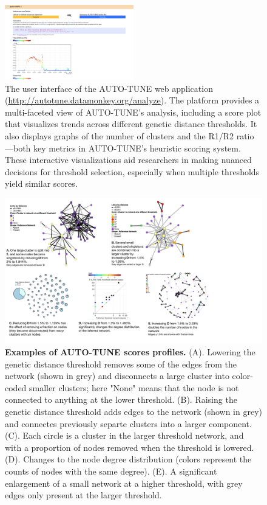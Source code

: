 \documentclass[utf8]{FrontiersinHarvard} %
\begin{document}
\begin{figure}[h!]
  \centering
  \includegraphics[width=0.5\textwidth]{./figures/webapp.png}
	\caption{ The user interface of the AUTO-TUNE web application
		(\url{http://autotune.datamonkey.org/analyze}). The platform provides a
		multi-faceted view of AUTO-TUNE's analysis, including a score plot that
		visualizes trends across different genetic distance thresholds. It also
		displays graphs of the number of clusters and the R1/R2 ratio—both key metrics
		in AUTO-TUNE's heuristic scoring system. These interactive visualizations aid
		researchers in making nuanced decisions for threshold selection, especially
		when multiple thresholds yield similar scores.
	}\label{fig:webapp}
\end{figure}

\begin{figure}[h!]
	\centering
	\includegraphics[width=1.\textwidth]{figures/examples.pdf} 
	\vspace{0.01in}
	\caption{\textbf{Examples of AUTO-TUNE scores profiles.}
		(A). Lowering the genetic distance threshold removes some of the edges from the network (shown in grey) and disconnects a large cluster into color-coded smaller clusters; here "None" means that the node is not connected to anything at the lower threshold. (B). Raising the genetic distance threshold adds edges to the network (shown in grey) and connectes previously separte clusters into a larger component. (C). Each circle is a cluster in the larger threshold network, and with a proportion of nodes removed when the threshold is lowered. (D). Changes to the node degree distribution (colors represent the counts of nodes with the same degree). (E). A significant enlargement of a small network at a higher threshold, with grey edges only present at the larger threshold. }
	\label{fig:examples}
\end{figure}
\end{document}
